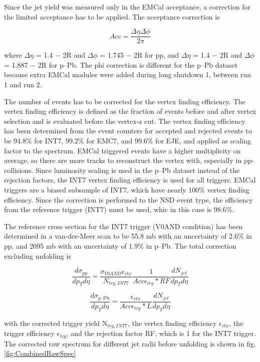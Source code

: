 \documentclass[ALICE]{ALICE_analysis_notes}
\newcommand{\pPb}{{\mbox{p--Pb}}\xspace}
\newcommand{\pp}{pp\xspace}
\begin{document}
Since the jet yield was measured only in the EMCal acceptance, a correction for the limited acceptance has to be applied. The acceptance correction is

\begin{equation}
    Acc = \frac{\Delta\eta \Delta\phi}{2\pi}
\end{equation}

where $\Delta\eta$ = 1.4 − 2R and $\Delta\phi$ = 1.745 − 2R for \pp, and $\Delta\eta$ = 1.4 − 2R and $\Delta\phi$ = 1.887 − 2R for \pPb. The phi correction is different for the \pPb dataset because extra EMCal modules were added during long shutdown 1, between run 1 and run 2.

The number of events has to be corrected for the vertex finding efficiency. The vertex finding efficiency is defined as the fraction of events before and after vertex selection and is evaluated before the vertex-z cut. The vertex finding efficiency has been determined from the event counters for accepted and rejected events to be 94.8$\%$ for INT7, 99.2$\%$ for EMC7, and 99.6$\%$ for EJE, and applied as scaling factor to the spectrum. EMCal triggered events have a higher multiplicity on average, so there are more tracks to reconstruct the vertex with, especially in pp-collisions. Since luminosity scaling is used in the \pPb dataset instead of the rejection factors, the INT7 vertex finding efficiency is used for all triggers. EMCal triggers are a biased subsample of INT7, which have nearly 100\% vertex finding efficiency. Since the correction is performed to the NSD event type, the efficiency from the reference trigger (INT7) must be used, whic in this case is 98.6\%.

The reference cross section for the INT7 trigger (V0AND condition) has been determined in a van-der-Meer scan to be 55.8 mb with an uncertainty of 2.6$\%$ in \pp, and 2095 mb with an uncertainty of 1.9$\%$ in \pPb. The total correction excluding unfolding is

\begin{equation}
   \frac{d\sigma_{\pp}}{dp_T d\eta} = \frac{\sigma_{V0AND}\epsilon_{vtx}}{N_{trg,INT7}} \frac{1}{Acc\epsilon_{trg}*RF} \frac{dN_{jet}}{dp_T d\eta}
\end{equation}

\begin{equation}
   \frac{d\sigma_{\pPb}}{dp_T d\eta} = \frac{\epsilon_{vtx}}{Acc\epsilon_{trg}*L} \frac{dN_{jet}}{dp_T d\eta}
\end{equation}

with the corrected trigger yield N$_{trg,INT7}$, the vertex finding efficiency $\epsilon_{vtx}$, the trigger efficiency $\epsilon_{trg}$, and the rejection factor RF, which is 1 for the INT7 trigger. The corrected raw spectrum for different jet radii before unfolding is shown in fig. \ref{fig:CombinedRawSpec}
\end{document}
